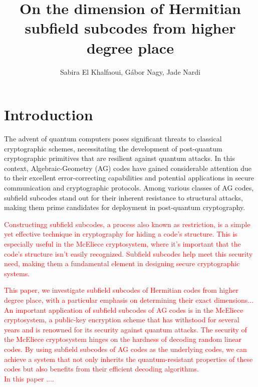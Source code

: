 \documentclass[a4paper]{amsart}
\title{On the dimension of Hermitian subfield subcodes from higher degree place}
\author{Sabira El Khalfaoui, G\'abor Nagy, Jade Nardi}
\date{}
\theoremstyle{plain}
\theoremstyle{definition}
\theoremstyle{remark}
\begin{document}
\begin{abstract}

\end{abstract}


\maketitle

\section{Introduction}

The advent of quantum computers poses significant threats to classical cryptographic schemes, necessitating the development of post-quantum cryptographic primitives that are resilient against quantum attacks. In this context, Algebraic-Geometry (AG) codes have gained considerable attention due to their excellent error-correcting capabilities and potential applications in secure communication and cryptographic protocols. Among various classes of AG codes, subfield subcodes stand out for their inherent resistance to structural attacks, making them prime candidates for deployment in post-quantum cryptography.


\textcolor{red}{Constructingg subfield subcodes, a process also known as restriction, is a simple yet effective technique in cryptography for hiding a code's structure. This is especially useful in the McEliece cryptosystem, where it's important that the code's structure isn't easily recognized. Subfield subcodes help meet this security need, making them a fundamental element in designing secure cryptographic systems.}


\textcolor{red}{	This paper, we investigate subfield subcodes of Hermitian codes from higher degree place, with a particular emphasis on determining their exact dimensions...  \\An important application of subfield subcodes of AG codes is in the McEliece cryptosystem, a public-key encryption scheme that has withstood for several years and is renowned for its security against quantum attacks. The security of the McEliece cryptosystem hinges on the hardness of decoding random linear codes. By using subfield subcodes of AG codes as the underlying codes, we can achieve a system that not only inherits the quantum-resistant properties of these codes but also benefits from their efficient decoding algorithms.\\
	In this paper ....}
\end{document}
